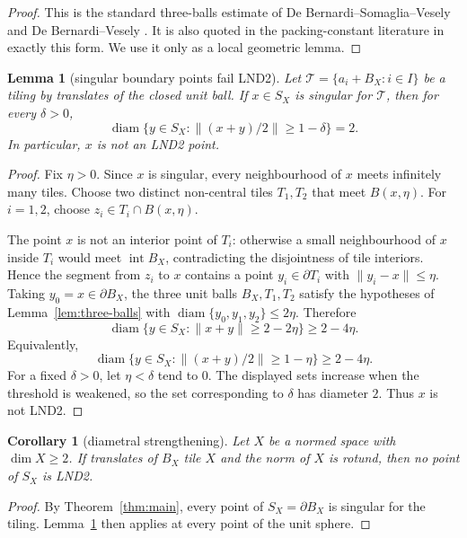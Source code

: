 \documentclass[11pt]{amsart}
\newtheorem{lemma}[theorem]{Lemma}
\newtheorem{corollary}[theorem]{Corollary}
\theoremstyle{definition}
\theoremstyle{remark}
\newcommand{\T}{\mathcal T}
\newcommand{\intt}{\operatorname{int}}
\newcommand{\diam}{\operatorname{diam}}
\begin{document}
\begin{proof}
This is the standard three-balls estimate of De Bernardi--Somaglia--Vesely
\cite[Lemma 3.7]{DSV} and De Bernardi--Vesely \cite[Lemma 4.5]{DV}. It is
also quoted in the packing-constant literature in exactly this form. We use it
only as a local geometric lemma.
\end{proof}

\begin{lemma}[singular boundary points fail LND2]\label{lem:singular-lnd2}
Let \(\T=\{a_i+B_X:i\in I\}\) be a tiling by translates of the closed unit ball.
If \(x\in S_X\) is singular for \(\T\), then for every \(\delta>0\),
\[
  \diam\{y\in S_X:\|(x+y)/2\|\geq 1-\delta\}=2.
\]
In particular, \(x\) is not an LND2 point.
\end{lemma}

\begin{proof}
Fix \(\eta>0\). Since \(x\) is singular, every neighbourhood of \(x\) meets
infinitely many tiles. Choose two distinct non-central tiles \(T_1,T_2\) that
meet \(B(x,\eta)\). For \(i=1,2\), choose \(z_i\in T_i\cap B(x,\eta)\).

The point \(x\) is not an interior point of \(T_i\): otherwise a small
neighbourhood of \(x\) inside \(T_i\) would meet \(\intt B_X\), contradicting
the disjointness of tile interiors. Hence the segment from \(z_i\) to \(x\)
contains a point \(y_i\in\partial T_i\) with \(\|y_i-x\|\leq \eta\). Taking
\(y_0=x\in\partial B_X\), the three unit balls \(B_X,T_1,T_2\) satisfy the
hypotheses of Lemma~\ref{lem:three-balls} with
\(\diam\{y_0,y_1,y_2\}\leq 2\eta\). Therefore
\[
  \diam\{y\in S_X:\|x+y\|\geq 2-2\eta\}\geq 2-4\eta .
\]
Equivalently,
\[
  \diam\{y\in S_X:\|(x+y)/2\|\geq 1-\eta\}\geq 2-4\eta .
\]
For a fixed \(\delta>0\), let \(\eta<\delta\) tend to \(0\). The displayed
sets increase when the threshold is weakened, so the set corresponding to
\(\delta\) has diameter \(2\). Thus \(x\) is not LND2.
\end{proof}

\begin{corollary}[diametral strengthening]\label{cor:no-lnd2}
Let \(X\) be a normed space with \(\dim X\geq2\). If translates of \(B_X\) tile
\(X\) and the norm of \(X\) is rotund, then no point of \(S_X\) is LND2.
\end{corollary}

\begin{proof}
By Theorem~\ref{thm:main}, every point of \(S_X=\partial B_X\) is singular for
the tiling. Lemma~\ref{lem:singular-lnd2} then applies at every point of the
unit sphere.
\end{proof}
\end{document}
